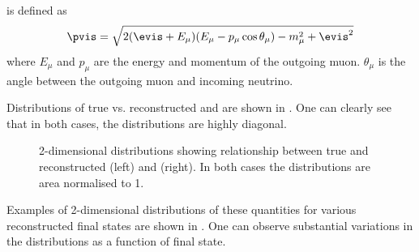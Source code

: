 \pvis is defined as
\begin{equation}
	\pvis = \sqrt{ 2(\evis + E_{\mu})(E_{\mu} - p_{\mu}\cos\theta_{\mu}) - m_{\mu}^{2} + \evis^{2} }
\end{equation}
where $E_{\mu}$ and $p_{\mu}$ are the energy and momentum of the outgoing muon.
$\theta_{\mu}$ is the angle between the outgoing muon and incoming neutrino.

Distributions of true vs. reconstructed \evis and \pvis are shown in .
One can clearly see that in both cases, the distributions are highly diagonal.

\begin{figure}[h]
	\begin{minipage}[t]{.5\linewidth}
		\begin{adjustbox}{max totalsize=\linewidth, center}
			
		\end{adjustbox}	
	\end{minipage}
	\hfill
	\begin{minipage}[t]{.5\linewidth}
		\begin{adjustbox}{max totalsize=\linewidth, center}
			
		\end{adjustbox}
	\end{minipage}
	\caption[True vs. reconstructed \evis (left) and \pvis (right)]{2-dimensional distributions showing relationship between true and reconstructed \evis (left) and \pvis (right). In both cases the distributions are area normalised to 1.}
	\label{fig:visibleTrueReco}
\end{figure}

Examples of 2-dimensional distributions of these quantities for various reconstructed final states are shown in .
One can observe substantial variations in the distributions as a function of final state.

